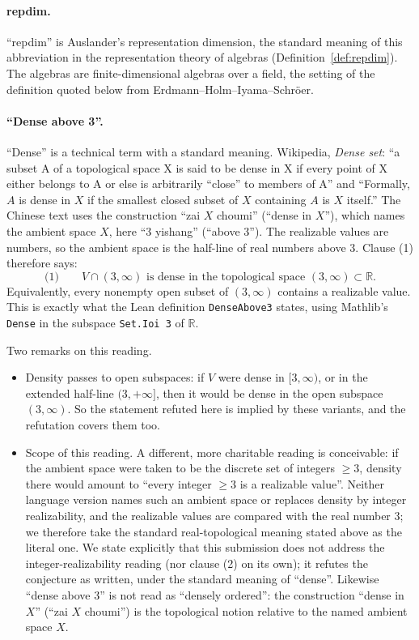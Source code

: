 \documentclass[11pt]{article}
\theoremstyle{definition}
\theoremstyle{remark}
\renewcommand{\_}{\oldus\allowbreak}
\begin{document}
\paragraph{repdim.} ``repdim'' is Auslander's representation dimension, the standard meaning of this
abbreviation in the representation theory of algebras (Definition~\ref{def:repdim}). The algebras are
finite-dimensional algebras over a field, the setting of the definition quoted below from
Erdmann--Holm--Iyama--Schr\"oer.

\paragraph{``Dense above 3''.} ``Dense'' is a technical term with a standard meaning. Wikipedia,
\emph{Dense set}: ``a subset A of a topological space X is said to be dense in X if every point of X
either belongs to A or else is arbitrarily ``close'' to members of A'' and ``Formally, $A$ is dense in
$X$ if the smallest closed subset of $X$ containing $A$ is $X$ itself.'' The Chinese text uses the
construction ``zai $X$ choumi'' (``dense in $X$''), which names the ambient space $X$, here ``3 yishang''
(``above 3''). The realizable values are numbers, so the ambient space is the half-line of real numbers
above $3$. Clause (1) therefore says:
\[
  \text{(1)}\qquad V \cap (3,\infty) \text{ is dense in the topological space } (3,\infty) \subset \mathbb{R}.
\]
Equivalently, every nonempty open subset of $(3,\infty)$ contains a realizable value. This is exactly
what the Lean definition \texttt{DenseAbove3} states, using Mathlib's \texttt{Dense} in the subspace
\texttt{Set.Ioi 3} of $\mathbb{R}$.

Two remarks on this reading.
\begin{itemize}
  \item Density passes to open subspaces: if $V$ were dense in $[3,\infty)$, or in the extended
        half-line $(3,+\infty]$, then it would be dense in the open subspace $(3,\infty)$. So the
        statement refuted here is implied by these variants, and the refutation covers them too.
  \item Scope of this reading. A different, more charitable reading is conceivable: if the ambient space
        were taken to be the discrete set of integers $\ge 3$, density there would amount to ``every
        integer $\ge 3$ is a realizable value''. Neither language version names such an ambient space or
        replaces density by integer realizability, and the realizable values are compared with the real
        number $3$; we therefore take the standard real-topological meaning stated above as the literal
        one. We state explicitly that this submission does not address the integer-realizability
        reading (nor clause (2) on its own); it refutes the conjecture as written, under the standard
        meaning of ``dense''. Likewise ``dense above 3'' is not read as ``densely ordered'': the
        construction ``dense in $X$'' (``zai $X$ choumi'') is the topological notion relative to the named
        ambient space $X$.
\end{itemize}
\end{document}
